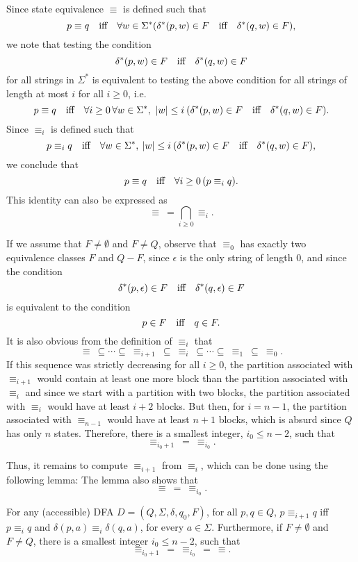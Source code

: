 \medskip
Since state equivalence $\equiv$ is defined such that
$$p\equiv q\quad\hbox{iff}\quad
\forall w\in\Sigma^*(\delta^*(p,w)\in F\quad\hbox{iff}\quad
                           \delta^*(q,w)\in F),$$
we note that testing the condition
$$\delta^*(p,w)\in F\quad\hbox{iff}\quad  \delta^*(q,w)\in F$$
for all strings in $\Sigma^*$
is equivalent to testing the above condition for
all strings of length at most $i$ for all $i\geq 0$, i.e.
$$p\equiv q\quad\hbox{iff}\quad
\forall i\geq 0\, \forall w\in\Sigma^*,\ |w|\leq i\>
(\delta^*(p,w)\in F\quad\hbox{iff}\quad
                           \delta^*(q,w)\in F).$$
Since $\equiv_i$ is defined such that
$$p\equiv_i q\quad\hbox{iff}\quad
\forall w\in\Sigma^*,\> |w| \leq i\> (\delta^*(p,w)\in F\quad\hbox{iff}\quad
                           \delta^*(q,w)\in F),$$
we conclude that
$$p\equiv q\quad \hbox{iff}\quad \forall i\geq 0\,(p \equiv_i q).$$
This identity can also be expressed as
$$\equiv\> = \bigcap_{i\geq 0} \equiv_i.$$

\medskip
If we assume that $F\not=\emptyset$ and $F\not= Q$,
observe that $\equiv_0$ has exactly two equivalence
classes $F$ and $Q - F$, since $\epsilon$ is the only
string of length $0$, and since the condition
$$\delta^*(p,\epsilon)\in F\quad\hbox{iff}\quad  \delta^*(q,\epsilon)\in F$$
is equivalent to the condition
$$p\in F\quad\hbox{iff}\quad q\in F.$$
It is also obvious from the definition of $\equiv_i$ that
$$\equiv\> \subseteq \cdots \subseteq\> \equiv_{i+1}\> 
\subseteq\> \equiv_{i}\> \subseteq
\cdots \subseteq \> \equiv_1\>\subseteq\> \equiv_0.$$
If this sequence was strictly decreasing for all $i \geq 0$, 
the partition associated
with $\equiv_{i+1}$ would contain at least one more block than
the partition associated with $\equiv_i$ and since
we start with a partition with two blocks, the partition
associated with $\equiv_i$ would have at least $i + 2$ blocks.
But then, for $i = n - 1$, the partition associated with
$\equiv_{n-1}$ would have at least $n + 1$ blocks,
which is absurd since $Q$ has only $n$ states. Therefore,
there is a smallest integer,  $i_0\leq n - 2$, such that
\[
\equiv_{i_{0} + 1}\> = \> \equiv_{i_{0}}.
\]

\medskip
Thus, it remains to compute $\equiv_{i+1}$ from $\equiv_i$,
which can be done using the following lemma:
The  lemma also shows that
$$\equiv\> = \> \equiv_{i_{0}}.$$

\begin{lemma}
\label{lem5}
For any (accessible) DFA $D = (Q, \Sigma, \delta, q_0, F)$,
for all $p, q\in Q$,
$p  \equiv_{i+1} q$ iff $p \equiv_{i} q$ and
$\delta(p,a) \equiv_{i} \delta(q,a)$, for every $a\in \Sigma$.
Furthermore, if  $F\not=\emptyset$ and $F\not= Q$,
there is a smallest integer $i_0\leq n-2$, such that
$$\equiv_{i_{0} + 1}\> = \> \equiv_{i_{0}}\> = \> \equiv.$$
\end{lemma}


